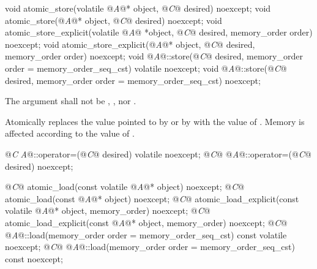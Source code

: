 %
%
%
%
%
%
\begin{itemdecl}
void atomic_store(volatile @\textit{A}@* object, @\textit{C}@ desired) noexcept;
void atomic_store(@\textit{A}@* object, @\textit{C}@ desired) noexcept;
void atomic_store_explicit(volatile @\textit{A}@ *object, @\textit{C}@ desired, memory_order order) noexcept;
void atomic_store_explicit(@\textit{A}@* object, @\textit{C}@ desired, memory_order order) noexcept;
void @\textit{A}@::store(@\textit{C}@ desired, memory_order order = memory_order_seq_cst) volatile noexcept;
void @\textit{A}@::store(@\textit{C}@ desired, memory_order order = memory_order_seq_cst) noexcept;
\end{itemdecl}

\begin{itemdescr}
\pnum
\requires The  argument shall not be ,
, nor .

\pnum
\effects Atomically replaces the value pointed to by  or by 
with the value of . Memory is affected according to the value of
.
\end{itemdescr}

%
%
\begin{itemdecl}
@\textit{C} \textit{A}@::operator=(@\textit{C}@ desired) volatile noexcept;
@\textit{C}@ @\textit{A}@::operator=(@\textit{C}@ desired) noexcept;
\end{itemdecl}

\begin{itemdescr}
\pnum
\effects {}

\pnum
\returns {}
\end{itemdescr}

%
%
%
%
%
%
\begin{itemdecl}
@\textit{C}@ atomic_load(const volatile @\textit{A}@* object) noexcept;
@\textit{C}@ atomic_load(const @\textit{A}@* object) noexcept;
@\textit{C}@ atomic_load_explicit(const volatile @\textit{A}@* object, memory_order) noexcept;
@\textit{C}@ atomic_load_explicit(const @\textit{A}@* object, memory_order) noexcept;
@\textit{C}@ @\textit{A}@::load(memory_order order = memory_order_seq_cst) const volatile noexcept;
@\textit{C}@ @\textit{A}@::load(memory_order order = memory_order_seq_cst) const noexcept;
\end{itemdecl}

